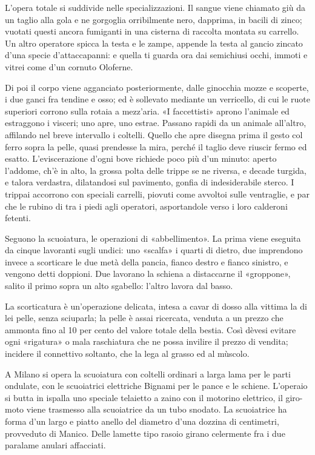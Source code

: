 L’opera totale si suddivide nelle specializzazioni. Il sangue viene chiamato giù da un taglio alla gola e ne gorgoglia orribilmente nero, dapprima, in bacili di zinco; vuotati questi ancora fumiganti in una cisterna di raccolta montata su carrello. Un altro operatore spicca la testa e le zampe, appende la testa al gancio zincato d’una specie d’attaccapanni: e quella ti guarda ora dai semichiusi occhi, immoti e vitrei come d’un cornuto Oloferne.

Di poi il corpo viene agganciato posteriormente, dalle ginocchia mozze e scoperte, i due ganci fra tendine e osso; ed è sollevato mediante un verricello, di cui le ruote superiori corrono sulla rotaia a mezz’aria. «I faccettisti» aprono l’animale ed estraggono i visceri; uno apre, uno estrae. Passano rapidi da un animale all’altro, affilando nel breve intervallo i coltelli. Quello che apre disegna prima il gesto col ferro sopra la pelle, quasi prendesse la mira, perché il taglio deve riuscir fermo ed esatto. L’eviscerazione d’ogni bove richiede poco più d’un minuto: aperto l’addome, ch’è in alto, la grossa polta delle trippe se ne riversa, e decade turgida, e talora verdastra, dilatandosi sul pavimento, gonfia di indesiderabile sterco. I trippai accorrono con speciali carrelli, piovuti come avvoltoi sulle ventraglie, e par che le rubino di tra i piedi agli operatori, asportandole verso i loro calderoni fetenti.

Seguono la scuoiatura, le operazioni di «abbellimento». La prima viene eseguita da cinque lavoranti sugli undici: uno «scalfa» i quarti di dietro, due imprendono invece a scorticare le due metà della pancia, fianco destro e fianco sinistro, e vengono detti doppioni. Due lavorano la schiena a distaccarne il «groppone», salito il primo sopra un alto sgabello: l’altro lavora dal basso.

La scorticatura è un’operazione delicata, intesa a cavar di dosso alla vittima la di lei pelle, senza sciuparla; la pelle è assai ricercata, venduta a un prezzo che ammonta fino al 10 per cento del valore totale della bestia. Così dèvesi evitare ogni «rigatura» o mala raschiatura che ne possa invilire il prezzo di vendita; incidere il connettivo soltanto, che la lega al grasso ed al mùscolo.

A Milano si opera la scuoiatura con coltelli ordinari a larga lama per le parti ondulate, con le scuoiatrici elettriche Bignami per le pance e le schiene. L’operaio si butta in ispalla uno speciale telaietto a zaino con il motorino elettrico, il giro-moto viene trasmesso alla scuoiatrice da un tubo snodato. La scuoiatrice ha forma d’un largo e piatto anello del diametro d’una dozzina di centimetri, provveduto di Manico. Delle lamette tipo rasoio girano celermente fra i due paralame anulari affacciati.


